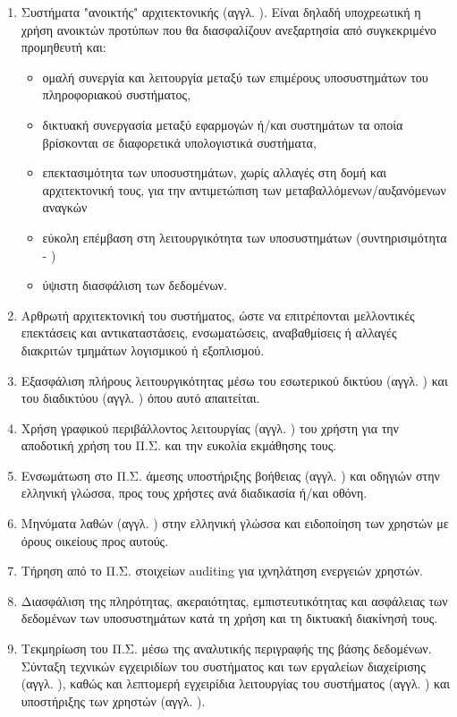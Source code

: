 \documentclass{assignment}
\begin{document}
\begin{enumerate}
\item Συστήματα "ανοικτής" αρχιτεκτονικής (αγγλ. ). Είναι δηλαδή υποχρεωτική η χρήση ανοικτών προτύπων που θα διασφαλίζουν ανεξαρτησία από συγκεκριμένο προμηθευτή και:

  \begin{itemize}
    \item ομαλή συνεργία και λειτουργία μεταξύ των επιμέρους υποσυστημάτων του πληροφοριακού συστήματος,
    \item δικτυακή συνεργασία μεταξύ εφαρμογών ή/και συστημάτων τα οποία βρίσκονται σε διαφορετικά υπολογιστικά συστήματα,
    \item επεκτασιμότητα των υποσυστημάτων, χωρίς αλλαγές στη δομή και αρχιτεκτονική τους, για την αντιμετώπιση των μεταβαλλόμενων/αυξανόμενων αναγκών
    \item εύκολη επέμβαση στη λειτουργικότητα των υποσυστημάτων (συντηρισιμότητα - )
    \item ύψιστη διασφάλιση των δεδομένων.
  \end{itemize}

\item Αρθρωτή αρχιτεκτονική του συστήματος, ώστε να επιτρέπονται μελλοντικές επεκτάσεις και αντικαταστάσεις, ενσωματώσεις, αναβαθμίσεις ή αλλαγές διακριτών τμημάτων λογισμικού ή εξοπλισμού.

\item Εξασφάλιση πλήρους λειτουργικότητας μέσω του εσωτερικού δικτύου (αγγλ. ) και του διαδικτύου (αγγλ. ) όπου αυτό απαιτείται.

\item Χρήση γραφικού περιβάλλοντος λειτουργίας (αγγλ. ) του χρήστη για την αποδοτική χρήση του Π.Σ. και την ευκολία εκμάθησης τους.

\item Ενσωμάτωση στο Π.Σ. άμεσης υποστήριξης βοήθειας (αγγλ. ) και οδηγιών στην ελληνική γλώσσα, προς τους χρήστες ανά διαδικασία ή/και οθόνη.

\item Μηνύματα λαθών (αγγλ. ) στην ελληνική γλώσσα και ειδοποίηση των χρηστών με όρους οικείους προς αυτούς.

\item Tήρηση από το Π.Σ. στοιχείων auditing για ιχνηλάτηση
ενεργειών χρηστών.

\item Διασφάλιση της πληρότητας, ακεραιότητας, εμπιστευτικότητας και ασφάλειας των δεδομένων των υποσυστημάτων κατά τη χρήση και τη δικτυακή διακίνησή τους.

\item Τεκμηρίωση του Π.Σ. μέσω της αναλυτικής περιγραφής της βάσης δεδομένων. Σύνταξη τεχνικών εγχειριδίων του συστήματος και των εργαλείων διαχείρισης (αγγλ. ), καθώς και λεπτομερή εγχειρίδια λειτουργίας του συστήματος (αγγλ.  ) και υποστήριξης των χρηστών (αγγλ. ).

\end{enumerate}
\end{document}

